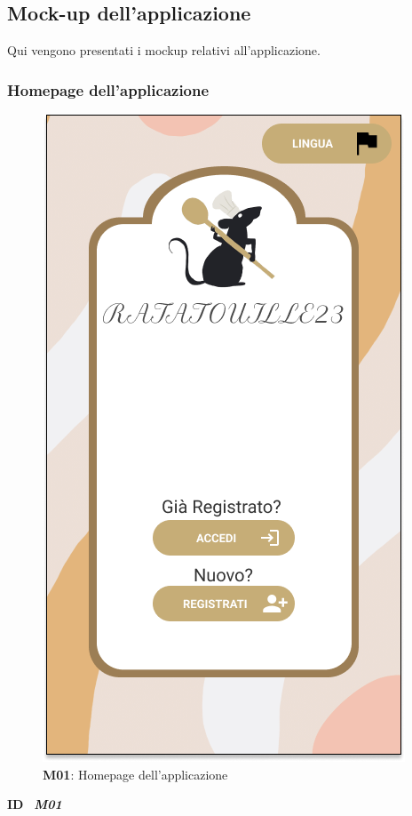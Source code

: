 \subsection{Mock-up dell'applicazione}
    \begin{flushleft}
        Qui vengono presentati i mockup relativi all'applicazione.
    \end{flushleft}
    \subsubsection{Homepage dell'applicazione}
        \begin{figure}[H]
          \centering
          \includegraphics[scale=0.5]{assets/Mockup/Mockup_Homepage.png}
          \caption{\textbf{M01}: Homepage dell'applicazione}\label{fig:Mockup_Homepage}
        \end{figure}
        \begin{flushleft}
            \textbf{ID} \ \Large{\textit{\textbf{M01}}}\\
        \end{flushleft}

